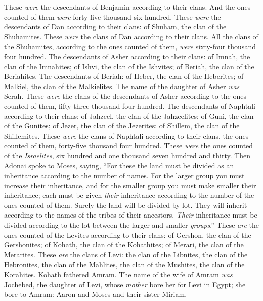 \begin{biblechapter}
\verse These \textit{were} the descendants of Benjamin according to their clans. And the ones counted of them \textit{were} forty-five thousand six hundred.
\verse These \textit{were} the descendants of Dan according to their clans: of Shuham, the clan of the Shuhamites. These \textit{were} the clans of Dan according to their clans.
\verse All the clans of the Shuhamites, according to the ones counted of them, \textit{were} sixty-four thousand four hundred.
\verse The descendants of Asher according to their clans: of Imnah, the clan of the Imnahites; of Ishvi, the clan of the Ishvites; of Beriah, the clan of the Beriahites.
\verse The descendants of Beriah: of Heber, the clan of the Heberites; of Malkiel, the clan of the Malkielites.
\verse The name of the daughter of Asher \textit{was} Serah.
\verse These \textit{were} the clans of the descendants of Asher according to the ones counted of them, fifty-three thousand four hundred.
\verse The descendants of Naphtali according to their clans: of Jahzeel, the clan of the Jahzeelites; of Guni, the clan of the Gunites;
\verse of Jezer, the clan of the Jezerites; of Shillem, the clan of the Shillemites.
\verse These \textit{were} the clans of Naphtali according to their clans, the ones counted of them, forty-five thousand four hundred.
\verse These \textit{were} the ones counted of the \textit{Israelites}, six hundred and one thousand seven hundred and thirty.
\verse Then Adonai spoke to Moses, saying,
\verse “For these the land must be divided as an inheritance according to the number of names.
\verse For the larger group you must increase their inheritance, and for the smaller group you must make smaller their inheritance; each must be given \textit{their} inheritance according to the number of the ones counted of them.
\verse Surely the land will be divided by lot. They will inherit according to the names of the tribes of their ancestors.
\verse \textit{Their} inheritance must be divided according to the lot between the larger and smaller \textit{groups}.”
\verse These \textit{are} the ones counted of the Levites according to their clans: of Gershon, the clan of the Gershonites; of Kohath, the clan of the Kohathites; of Merari, the clan of the Merarites.
\verse These \textit{are} the clans of Levi: the clan of the Libnites, the clan of the Hebronites, the clan of the Mahlites, the clan of the Mushites, the clan of the Korahites. Kohath fathered Amram.
\verse The name of the wife of Amram \textit{was} Jochebed, the daughter of Levi, whose \textit{mother} bore her for Levi in Egypt; she bore to Amram: Aaron and Moses and their sister Miriam.

\end{biblechapter}
